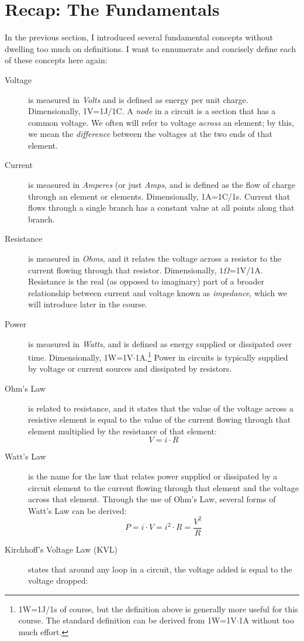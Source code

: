\section{Recap: The Fundamentals}
In the previous section, I introduced several fundamental concepts without dwelling too much on definitions. I want to ennumerate and concisely define each of these concepts here again:
\begin{description}
\item[Voltage] is measured in \textit{Volts} and is defined as energy per unit charge. Dimensionally, 1V=1J/1C. A \textit{node} in a circuit is a section that has a common voltage. We often will refer to voltage \textit{across} an element; by this, we mean the \textit{difference} between the voltages at the two ends of that element. 
\item[Current] is measured in \textit{Amperes} (or just \textit{Amps}, and is defined as the flow of charge through an element or elements. Dimensionally, 1A=1C/1s. Current that flows through a single branch has a constant value at all points along that branch.
\item[Resistance] is measured in \textit{Ohms}, and it relates the voltage across a resistor to the current flowing through that resistor. Dimensionally, $1\Omega$=1V/1A. Resistance is the real (as opposed to imaginary)  part of a broader relationship between current and voltage known as \textit{impedance}, which we will introduce later in the course.
\item[Power] is measured in \textit{Watts}, and is defined as energy supplied or dissipated over time. Dimensionally, 1W=1V$\cdot$1A.\footnote{1W=1J/1s of course, but the definition above is generally more useful for this course. The standard definition can be derived from 1W=1V$\cdot$1A without too much effort.} Power in circuits is typically supplied by voltage or current sources and dissipated by resistors.
\item[Ohm's Law] is related to resistance, and it states that the value of the voltage across a resistive element is equal to the value of the current flowing through that element multiplied by the resistance of that element:
$$V=i \cdot R$$
\item[Watt's Law] is the name for the law that relates power supplied or dissipated by a circuit element to the current flowing through that element and the voltage across that element. Through the use of Ohm's Law, several forms of Watt's Law can be derived: 
$$
P = i \cdot V = i^2 \cdot R = \frac{V^2}{R}
$$
\item[Kirchhoff's Voltage Law (KVL)] states that around any loop in a circuit, the voltage added is equal to the voltage dropped:

\end{description}
